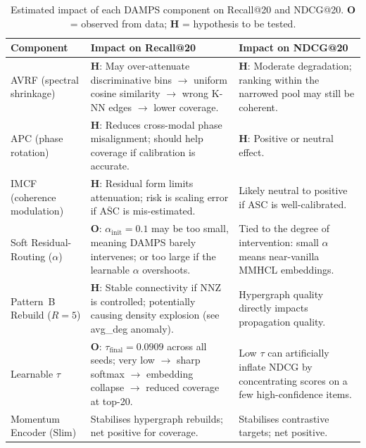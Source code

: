 \documentclass[12pt,a4paper]{article}
\begin{document}
\begin{table}[htbp]
\centering
\caption{Estimated impact of each DAMPS component on Recall@20 and NDCG@20.
\textbf{O} = observed from data; \textbf{H} = hypothesis to be tested.}
\label{tab:impact}
\begin{tabular}{|>{\raggedright\arraybackslash}p{3.5cm}|
                >{\raggedright\arraybackslash}p{4.5cm}|
                >{\raggedright\arraybackslash}p{4.5cm}|}
\hline
\rowcolor{tabhead}\textbf{Component} & \textbf{Impact on Recall@20} & \textbf{Impact on NDCG@20} \\
\hline
AVRF (spectral shrinkage)
  & \textbf{H}: May over-attenuate discriminative bins
    $\to$ uniform cosine similarity $\to$ wrong K-NN edges
    $\to$ lower coverage.
  & \textbf{H}: Moderate degradation; ranking within the
    narrowed pool may still be coherent. \\\hline

APC (phase rotation)
  & \textbf{H}: Reduces cross-modal phase misalignment;
    should help coverage if calibration is accurate.
  & \textbf{H}: Positive or neutral effect. \\\hline

IMCF (coherence modulation)
  & \textbf{H}: Residual form limits attenuation; risk is
    scaling error if $\overline{\text{ASC}}$ is mis-estimated.
  & Likely neutral to positive if ASC is well-calibrated. \\\hline

Soft Residual-Routing ($\alpha$)
  & \textbf{O}: $\alpha_{\text{init}} = 0.1$ may be too small,
    meaning DAMPS barely intervenes; or too large if the
    learnable $\alpha$ overshoots.
  & Tied to the degree of intervention: small $\alpha$ means
    near-vanilla MMHCL embeddings. \\\hline

Pattern~B Rebuild ($R = 5$)
  & \textbf{H}: Stable connectivity if NNZ is controlled;
    potentially causing density explosion (see avg\_deg anomaly).
  & Hypergraph quality directly impacts propagation quality. \\\hline

Learnable $\tau$
  & \textbf{O}: $\tau_{\text{final}} = 0.0909$ across all seeds;
    very low $\to$ sharp softmax $\to$ embedding collapse
    $\to$ reduced coverage at top-20.
  & Low $\tau$ can artificially inflate NDCG by concentrating
    scores on a few high-confidence items. \\\hline

Momentum Encoder (Slim)
  & Stabilises hypergraph rebuilds; net positive for coverage.
  & Stabilises contrastive targets; net positive. \\\hline
\end{tabular}
\end{table}
\end{document}
